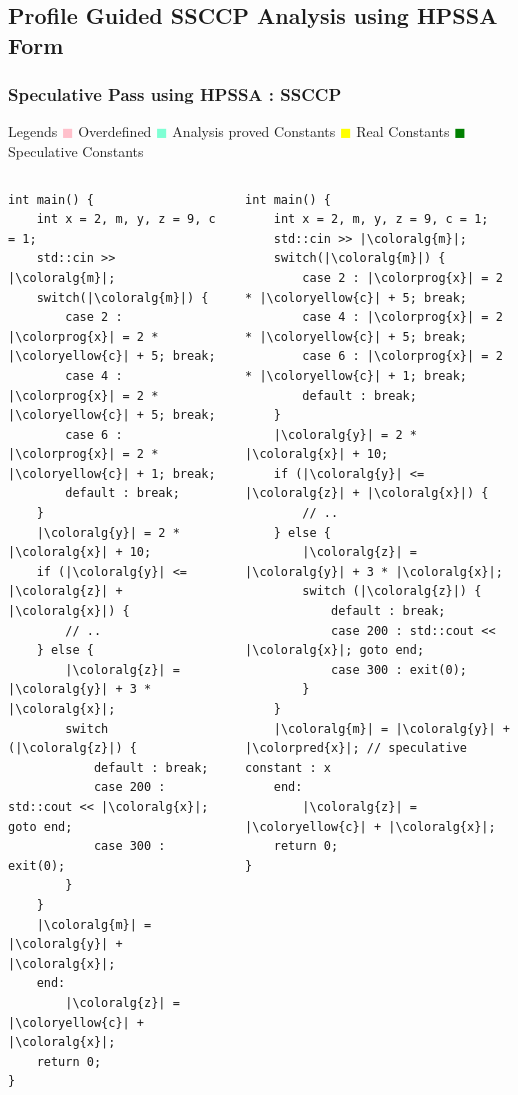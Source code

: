 \documentclass[aspectratio=169, compress]{beamer}
\newcommand{\colorprog}[1]{\colorbox{aquamarine}{#1}}
\newcommand{\colorpred}[1]{\colorbox{green}{#1}}
\newcommand{\coloralg}[1]{\colorbox{pink}{#1}}
\newcommand{\coloryellow}[1]{\colorbox{yellow}{#1}}
\begin{document}
\subsection{Profile Guided SSCCP Analysis using HPSSA Form}
\begin{frame}[fragile]
	\frametitle{Speculative Pass using HPSSA : SSCCP}
	Legends \textcolor{pink}{$\blacksquare$} Overdefined  \textcolor{aquamarine}{$\blacksquare$} Analysis proved Constants \textcolor{yellow}{$\blacksquare$} Real Constants
	\textcolor{green}{$\blacksquare$} Speculative Constants 
	\begin{columns}
		\begin{column}{0.4\textwidth}
			\begin{verbatim}
int main() {
	int x = 2, m, y, z = 9, c = 1;
	std::cin >> |\coloralg{m}|;
	switch(|\coloralg{m}|) {   
		case 2 : |\colorprog{x}| = 2 * |\coloryellow{c}| + 5; break;
		case 4 : |\colorprog{x}| = 2 * |\coloryellow{c}| + 5; break;
		case 6 : |\colorprog{x}| = 2 * |\coloryellow{c}| + 1; break;
		default : break;
	}
	|\coloralg{y}| = 2 * |\coloralg{x}| + 10;
	if (|\coloralg{y}| <= |\coloralg{z}| + |\coloralg{x}|) {
		// ..
	} else {
		|\coloralg{z}| = |\coloralg{y}| + 3 * |\coloralg{x}|;
		switch (|\coloralg{z}|) {
			default : break;
			case 200 : std::cout << |\coloralg{x}|; goto end;
			case 300 : exit(0);
		}
	}
	|\coloralg{m}| = |\coloralg{y}| + |\coloralg{x}|;  
	end:
		|\coloralg{z}| = |\coloryellow{c}| + |\coloralg{x}|;
	return 0;
}
			\end{verbatim}
		\end{column}
		\begin{column}{0.4\textwidth}  
			\begin{verbatim}
int main() {
	int x = 2, m, y, z = 9, c = 1;
	std::cin >> |\coloralg{m}|;
	switch(|\coloralg{m}|) {   
		case 2 : |\colorprog{x}| = 2 * |\coloryellow{c}| + 5; break;
		case 4 : |\colorprog{x}| = 2 * |\coloryellow{c}| + 5; break;
		case 6 : |\colorprog{x}| = 2 * |\coloryellow{c}| + 1; break;
		default : break;
	}
	|\coloralg{y}| = 2 * |\coloralg{x}| + 10;
	if (|\coloralg{y}| <= |\coloralg{z}| + |\coloralg{x}|) {
		// ..
	} else {
		|\coloralg{z}| = |\coloralg{y}| + 3 * |\coloralg{x}|;
		switch (|\coloralg{z}|) {
			default : break;
			case 200 : std::cout << |\coloralg{x}|; goto end;
			case 300 : exit(0);
		}
	}
	|\coloralg{m}| = |\coloralg{y}| + |\colorpred{x}|; // speculative constant : x  
	end:
		|\coloralg{z}| = |\coloryellow{c}| + |\coloralg{x}|;
	return 0;
}
		\end{verbatim}
		\end{column}
	\end{columns}
\end{frame}
\end{document}
